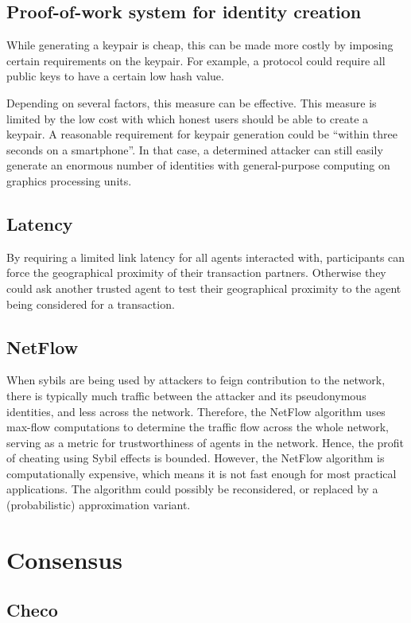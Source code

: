 \subsection{Proof-of-work system for identity creation}\label{sssection:chain_creation_cost}
While generating a keypair is cheap, this can be made more costly by imposing certain requirements on the keypair. For example, a protocol could require all public keys to have a certain low hash value.

Depending on several factors, this measure can be effective. This measure is limited by the low cost with which honest users should be able to create a keypair. A reasonable requirement for keypair generation could be ``within three seconds on a smartphone''. In that case, a determined attacker can still easily generate an enormous number of identities with general-purpose computing on graphics processing units.

\subsection{Latency}
By requiring a limited link latency for all agents interacted with, participants can force the geographical proximity of their transaction partners. Otherwise they could ask another trusted agent to test their geographical proximity to the agent being considered for a transaction.

\subsection{NetFlow}
When sybils are being used by attackers to feign contribution to the network, 
there is typically much traffic between the attacker and its pseudonymous identities, 
and less across the network. 
Therefore, the NetFlow algorithm uses max-flow computations to determine the traffic flow across the whole network, 
serving as a metric for trustworthiness of agents in the network. Hence, the profit of cheating using Sybil effects is bounded. 
However, the NetFlow algorithm is computationally expensive, 
which means it is not fast enough for most practical applications. 
The algorithm could possibly be reconsidered, 
or replaced by a (probabilistic) approximation variant. 

\section{Consensus}
\subsection{Checo}
